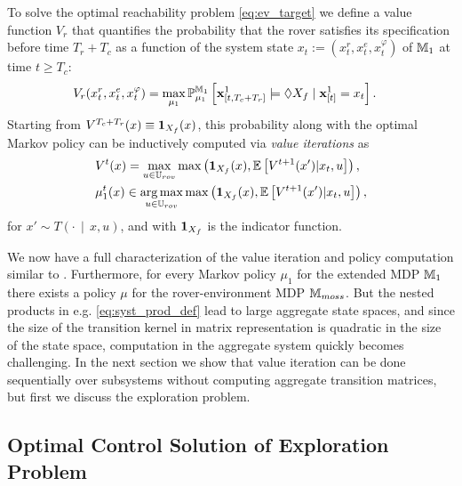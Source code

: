 \documentclass[conference]{IEEEtran}
\renewcommand{\cite}[1]{\citep{#1}}
\begin{document}
To solve the optimal reachability problem \eqref{eq:ev_target} we define a value function $V_r$ that quantifies the probability that the rover satisfies its specification before time $T_r + T_c$ as a function of the system state $x_{t}:=(x_{t}^r, x_{t}^e, x_{t}^\varphi)$ of $\mathbb{M}_1$ at time $t\geq T_c$:
\begin{equation}
\label{eq:rovervalue}
\begin{aligned}
	& V_r(x_{t}^r, x_{t}^e, x_{t}^\varphi)  = \max_{\mu_1} \mathbb{P}_{\mu_1}^{\MDP_1} \left[\mathbf{x}^1_{[t,T_c+T_r]} \models \lozenge X_f \mid \mathbf{x}_{[t]}^1 = x_{t} \right].
\end{aligned}
\end{equation}
Starting from $ V^{T_c+T_r}(x)\equiv \mathbf{1}_{X_f}(x)$, this probability along with the optimal Markov policy can be inductively computed via \emph{value iterations} as
\begin{align}
	& V^{t}(x)  = \max_{u \in \U_{rov}}  \max \left( \ind_{X_f}(x), \mathbb{E}\left[V^{t+1}(x'){\mid} x_t,u\right] \right) \label{eq:value_iter_mission}, \\
	& \pol_1^t(x) \in \argmax_{u\in \U_{rov}} \max  \left( \ind_{X_f}(x), \mathbb{E}\left[V^{t+1}(x'){\mid }x_t,u\right] \right), \notag
\end{align} 
for $x' \sim  T(\cdot\,{ \mid}\, x, u)$, and with $\mathbf{1}_{X_f}$ is the indicator function. 

We now have a full characterization of the value iteration and policy computation similar to \cite{Abate2008}. Furthermore, for every Markov policy $\mu_1$ for the extended MDP $\mathbb{M}_1$ there exists a policy $\mu$ for the rover-environment MDP $\mathbb{M}_{moss}$. But the nested products in e.g. \eqref{eq:syst_prod_def} lead to large aggregate state spaces, and since the size of the transition kernel in matrix representation is quadratic in the size of the state space, computation in the aggregate system quickly becomes challenging. In the next section we show that value iteration can be done sequentially over subsystems without computing aggregate transition matrices, but first we discuss the exploration problem.

\subsection{Optimal Control Solution of Exploration Problem}
\label{sub:information}
\end{document}
